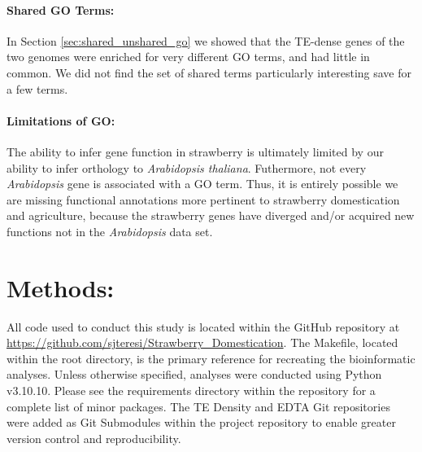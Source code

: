 \documentclass[fleqn,10pt]{olplainarticle}
\begin{document}
\paragraph{Shared GO Terms:}
In Section \ref{sec:shared_unshared_go} we showed that the TE-dense genes of the two genomes were enriched for very different GO terms, and had little in common.
We did not find the set of shared terms particularly interesting save for a few terms.


\paragraph{Limitations of GO:}
The ability to infer gene function in strawberry is ultimately limited by our ability to infer orthology to \textit{Arabidopsis thaliana}.
Futhermore, not every \textit{Arabidopsis} gene is associated with a GO term.
Thus, it is entirely possible we are missing functional annotations more pertinent to strawberry domestication and agriculture, because the strawberry genes have diverged and/or acquired new functions not in the \textit{Arabidopsis} data set.


\section{Methods:} \label{sec:methods}
All code used to conduct this study is located within the GitHub repository at \url{https://github.com/sjteresi/Strawberry_Domestication}.
The Makefile, located within the root directory, is the primary reference for recreating the bioinformatic analyses.
Unless otherwise specified, analyses were conducted using Python v3.10.10.
Please see the requirements directory within the repository for a complete list of minor packages.
The TE Density and EDTA Git repositories were added as Git Submodules within the project repository to enable greater version control and reproducibility.
\end{document}
